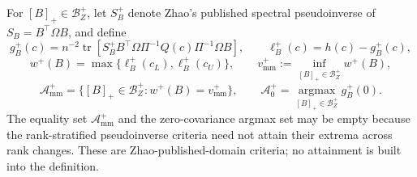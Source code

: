 For \([B]_+\in\mathcal B_Z^+\), let \(S_B^+\) denote Zhao's published spectral pseudoinverse of \(S_B=B^{\top}\Omega B\), and define
\[
g_B^+(c)=n^{-2}\operatorname{tr}\!\left[S_B^+B^{\top}\Omega\Pi^{-1}Q(c)\Pi^{-1}\Omega B\right],
\qquad \ell_B^+(c)=h(c)-g_B^+(c),
\]
\[
w^+(B)=\max\{\ell_B^+(c_L),\ell_B^+(c_U)\},
\qquad v_{\mathrm{mm}}^+:=\inf_{[B]_+\in\mathcal B_Z^+}w^+(B),
\]
\[
\mathcal A_{\mathrm{mm}}^+
=\{[B]_+\in\mathcal B_Z^+:w^+(B)=v_{\mathrm{mm}}^+\},
\qquad \mathcal A_0^+=\operatorname*{argmax}_{[B]_+\in\mathcal B_Z^+}g_B^+(0).
\]
The equality set \(\mathcal A_{\mathrm{mm}}^+\) and the zero-covariance argmax set may be empty because the rank-stratified pseudoinverse criteria need not attain their extrema across rank changes.  These are Zhao-published-domain criteria; no attainment is built into the definition.